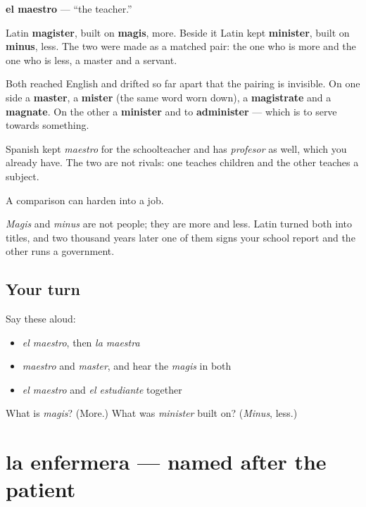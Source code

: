 \begin{cousinweb}
\textbf{el maestro} — \textquotedblleft{}the teacher.\textquotedblright{}

Latin \textbf{magister}, built on \textbf{magis}, more. Beside it Latin kept \textbf{minister}, built on \textbf{minus}, less. The two were made as a matched pair: the one who is more and the one who is less, a master and a servant.

Both reached English and drifted so far apart that the pairing is invisible. On one side a \textbf{master}, a \textbf{mister} (the same word worn down), a \textbf{magistrate} and a \textbf{magnate}. On the other a \textbf{minister} and to \textbf{administer} — which is to serve towards something.

Spanish kept \emph{maestro} for the schoolteacher and has \emph{profesor} as well, which you already have. The two are not rivals: one teaches children and the other teaches a subject.
\end{cousinweb}

\begin{grammarlens}[title={What you've built}]
A comparison can harden into a job.

\emph{Magis} and \emph{minus} are not people; they are more and less. Latin turned both into titles, and two thousand years later one of them signs your school report and the other runs a government.
\end{grammarlens}

\subsection*{Your turn}
Say these aloud:

\begin{itemize}
\raggedright
  \item \emph{el maestro}, then \emph{la maestra}
  \item \emph{maestro} and \emph{master}, and hear the \emph{magis} in both
  \item \emph{el maestro} and \emph{el estudiante} together
\end{itemize}

\begin{tcolorbox}[breakable,colback=teal!4,colframe=teal!35!black,title={Before you move on}]
What is \emph{magis}? (More.) What was \emph{minister} built on? (\emph{Minus}, less.)
\end{tcolorbox}
\section[la enfermera]{la enfermera — named after the patient}

